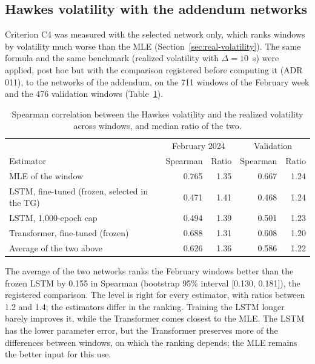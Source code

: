 \subsection{Hawkes volatility with the addendum networks}
\label{sec:addendum-volatility}

Criterion C4 was measured with the selected network only, which ranks windows by volatility
much worse than the MLE (Section~\ref{sec:real-volatility}). The same formula and the same
benchmark (realized volatility with $\Delta=10$~s) were applied, post
hoc but with the comparison registered before computing it (ADR 011), to the networks of the
addendum, on the 711 windows of the February week and the 476
validation windows (Table~\ref{tab:addendum-volatility}).

\begin{table}[htbp]
\centering
\caption{Spearman correlation between the Hawkes volatility and the realized volatility
across windows, and median ratio of the two.}
\label{tab:addendum-volatility}
\small
\begin{tabular}{lrrrr}
\toprule
& \multicolumn{2}{c}{February 2024} & \multicolumn{2}{c}{Validation} \\
Estimator & Spearman & Ratio & Spearman & Ratio \\
\midrule
MLE of the window & 0.765 & 1.35 & 0.667 & 1.24 \\
LSTM, fine-tuned (frozen, selected in the TG) & 0.471 & 1.41 & 0.468 & 1.24 \\
LSTM, 1,000-epoch cap & 0.494 & 1.39 & 0.501 & 1.23 \\
Transformer, fine-tuned (frozen) & 0.688 & 1.31 & 0.608 & 1.20 \\
Average of the two above & 0.626 & 1.36 & 0.586 & 1.22 \\
\bottomrule
\end{tabular}
\end{table}

The average of the two networks ranks the February windows better than the frozen LSTM by
0.155 in Spearman (bootstrap 95\% interval
[0.130, 0.181]), the registered comparison. The level is right for every estimator, with
ratios between 1.2 and 1.4; the estimators differ in the ranking. Training the LSTM longer
barely improves it, while the Transformer comes closest to the MLE. The LSTM has the lower
parameter error, but the Transformer preserves more of the differences between windows, on
which the ranking depends; the MLE remains the better input for this use.

